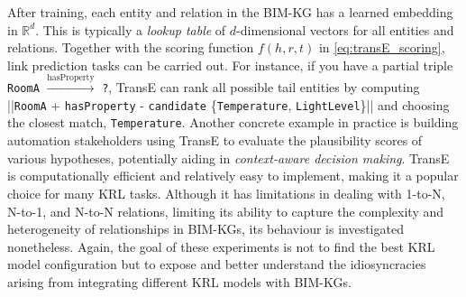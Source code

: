 \begin{enumerate}
After training, each entity and relation in the \ac{BIM-KG} has a learned embedding in $\mathbb{R}^d$. This is typically a \emph{lookup table} of $d$-dimensional vectors for all entities and relations. Together with the scoring function $f(h, r, t)$ in \autoref{eq:transE_scoring}, link prediction tasks can be carried out. For instance, if you have a partial triple \texttt{RoomA} $\xrightarrow{\text{hasProperty}}$ \texttt{?}, TransE can rank all possible tail entities by computing ||\texttt{RoomA} + \texttt{hasProperty} - \texttt{candidate} \in  
\{\texttt{Temperature}, \texttt{LightLevel}\}|| and choosing the closest match, \texttt{Temperature}.
Another concrete example in practice is building automation stakeholders using TransE to evaluate the plausibility scores of various hypotheses, potentially aiding in \textit{context-aware decision making}. TransE is computationally efficient and relatively easy to implement, making it a popular choice for many \ac{KRL} tasks. Although it has limitations in dealing with 1-to-N, N-to-1, and N-to-N relations, limiting its ability to capture the complexity and heterogeneity of relationships in \acp{BIM-KG}, its behaviour is investigated nonetheless. Again, the goal of these experiments is not to find the best \ac{KRL} model configuration but to expose and better understand the idiosyncracies arising from integrating different \ac{KRL} models with \acp{BIM-KG}.


\end{enumerate}
